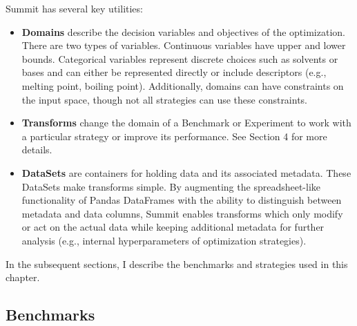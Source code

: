 Summit has several key utilities:

\begin{itemize}
    \item \textbf{Domains} describe the decision variables and objectives of the optimization.  There are two types of variables. Continuous variables have upper and lower bounds. Categorical variables represent discrete choices such as solvents or bases and can either be represented directly or include descriptors (e.g., melting point, boiling point). Additionally, domains can have constraints on the input space, though not all strategies can use these constraints. 
    \item \textbf{Transforms} change the domain of a Benchmark or Experiment to work with a particular strategy or improve its performance. See Section 4 for more details.
    \item \textbf{DataSets} are containers for holding data and its associated metadata. These DataSets make transforms simple. By  augmenting the spreadsheet-like functionality of Pandas DataFrames\cite{pandas} with the ability to distinguish between metadata and data columns, Summit enables transforms which only modify or act on the actual data while keeping additional metadata for further analysis (e.g., internal hyperparameters of optimization strategies). 
\end{itemize}

In the subsequent sections, I describe the benchmarks and strategies used in this chapter.

\subsection{Benchmarks}



 

